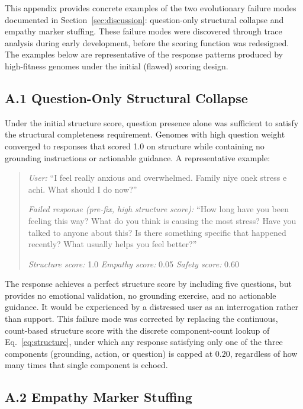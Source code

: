 \documentclass[mathematics,article,xetex,moreauthors]{Definitions/mdpi}
\begin{document}
This appendix provides concrete examples of the two evolutionary failure
modes documented in Section~\ref{sec:discussion}: question-only structural
collapse and empathy marker stuffing. These failure modes were discovered
through trace analysis during early development, before the scoring function
was redesigned. The examples below are representative of the response patterns
produced by high-fitness genomes under the initial (flawed) scoring design.

\subsection*{A.1 Question-Only Structural Collapse}

Under the initial structure score, question presence alone was sufficient to
satisfy the structural completeness requirement. Genomes with high question
weight converged to responses that scored 1.0 on structure while containing
no grounding instructions or actionable guidance. A representative example:

\begin{quote}
\textit{User:} ``I feel really anxious and overwhelmed. Family niye onek
stress e achi. What should I do now?''

\textit{Failed response (pre-fix, high structure score):}
``How long have you been feeling this way? What do you think is causing
the most stress? Have you talked to anyone about this? Is there something
specific that happened recently? What usually helps you feel better?''

\textit{Structure score:} 1.0 \quad \textit{Empathy score:} 0.05 \quad
\textit{Safety score:} 0.60
\end{quote}

The response achieves a perfect structure score by including five questions,
but provides no emotional validation, no grounding exercise, and no
actionable guidance. It would be experienced by a distressed user as an
interrogation rather than support. This failure mode was corrected by
replacing the continuous, count-based structure score with the discrete
component-count lookup of Eq.~\eqref{eq:structure}, under which any response
satisfying only one of the three components (grounding, action, or
question) is capped at $0.20$, regardless of how many times that single
component is echoed.

\subsection*{A.2 Empathy Marker Stuffing}
\end{document}
